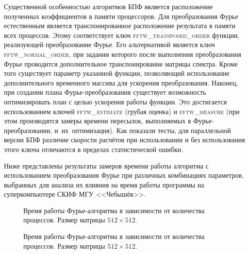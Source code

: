 Существенной особенностью алгоритмов БПФ является расположение полученных коэффициентов в памяти процессоров.
Для преобразования Фурье естественным является транспонированное расположение результата в памяти всех процессов.
Этому соответствует ключ \textsc{fftw\_transposed\_order} функции, реализующей преобразование Фурье.
Его альтернативой является ключ \textsc{fftw\_normal\_order}, при задании которого после выполнения преобразования Фурье
проводится дополнительное транспонирование матрицы спектра.
Кроме того существует параметр указанной функции, позволяющий использование дополнительного временного массива для ускорения преобразования.
Наконец, при создании плана Фурье-преобразования существует возможность оптимизировать план с целью ускорения работы функции.
Это достигается использованием ключей  \textsc{fftw\_estimate} (грубая оценка) и  \textsc{fftw\_measure} (при этом производятся замеры времени пересылок,
выполняемых в Фурье-преобразовании, и~их~оптимизация). Как показали тесты, для параллельной версии БПФ различие скорости расчётов
при использовании и без использования этого ключа отличаются в пределах статистической ошибки.

Ниже представлены результаты замеров времени работы алгоритма с использованием преобразования Фурье при различных комбинациях параметров,
выбранных для анализа их влияния на время работы программы на суперкомпьютере СКИФ МГУ <<Чебышёв>>.

    \newcommand{\minipagewidth}{0.45\linewidth}

    \begin{figure}[h!]
        \begin{center}
            \begin{minipage}{\minipagewidth}
                \caption{Время работы Фурье-алгоритма в зависимости от количества процессов. Размер матрицы $512 \times 512$. }
                \label{fig:AppVsFourier512Nomeasure}
            \end{minipage}
            \hfill
            \begin{minipage}{\minipagewidth}
                \caption{Время работы Фурье-алгоритма в зависимости от количества процессов. Размер матрицы $512 \times 512$.}
                \label{fig:AppVsFourier512Measure}
            \end{minipage}
        \end{center}
    \end{figure}

